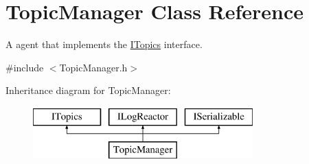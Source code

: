 \hypertarget{class_topic_manager}{}\section{Topic\+Manager Class Reference}
\label{class_topic_manager}


A agent that implements the \hyperlink{class_i_topics}{I\+Topics} interface.  




{\ttfamily \#include $<$Topic\+Manager.\+h$>$}

Inheritance diagram for Topic\+Manager\+:\begin{figure}[H]
\begin{center}
\leavevmode
\includegraphics[height=2.000000cm]{class_topic_manager}
\end{center}
\end{figure}
